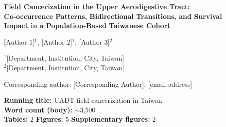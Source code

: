 \documentclass[12pt,a4paper]{article}
\newcommand{\AUTHOR}{[Author 1]$^{1}$, [Author 2]$^{1}$, [Author 3]$^{2}$}
\newcommand{\AFFIL}{%
  $^{1}$[Department, Institution, City, Taiwan]\\
  $^{2}$[Department, Institution, City, Taiwan]}
\newcommand{\CORRESPONDING}{[Corresponding Author], [email address]}
\begin{document}
\begin{titlepage}
  \centering
  \vspace*{2cm}
  {\LARGE\bfseries Field Cancerization in the Upper Aerodigestive Tract:\\
  Co-occurrence Patterns, Bidirectional Transitions, and Survival\\
  Impact in a Population-Based Taiwanese Cohort\par}
  \vspace{1.5cm}
  {\large \AUTHOR \par}
  \vspace{0.5cm}
  {\normalsize \AFFIL \par}
  \vspace{1cm}
  {\normalsize Corresponding author: \CORRESPONDING \par}
  \vspace{2cm}
  {\normalsize
    \textbf{Running title:} UADT field cancerization in Taiwan\\[0.5em]
    \textbf{Word count (body):} $\sim$3,500\\
    \textbf{Tables:} 2 \quad \textbf{Figures:} 5 \quad \textbf{Supplementary figures:} 2
  }
\end{titlepage}
\end{document}
